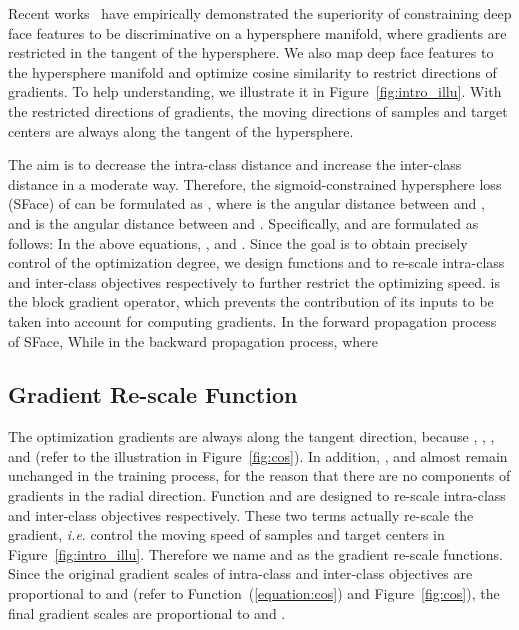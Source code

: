 \documentclass[journal,comsoc]{IEEEtran}
\begin{document}
Recent works~\cite{wang2017normface,Liu2017SphereFace,Wang2018CosFace,deng2019arcface} have empirically demonstrated the superiority of constraining deep face features to be discriminative on a hypersphere manifold, where gradients are restricted in the tangent of the hypersphere. We also map deep face features to the hypersphere manifold and optimize cosine similarity to restrict directions of gradients. To help understanding, we illustrate it in Figure~\ref{fig:intro_illu}. With the restricted directions of gradients, the moving directions of samples and target centers are always along the tangent of the hypersphere. 



The aim is to decrease the intra-class distance and increase the inter-class distance in a moderate way. Therefore, the sigmoid-constrained hypersphere loss (SFace) of  can be formulated as , where  is the angular distance between  and , and  is the angular distance  between  and . Specifically,   and  are formulated as follows:
In the above equations, , and . Since the goal is to obtain precisely control of the optimization degree, we design functions  and  to re-scale intra-class and inter-class objectives respectively to further restrict the optimizing speed.  is the block gradient operator, which prevents the contribution of its inputs to be taken into account for computing gradients. In the forward propagation process of SFace, 
While in the backward propagation process,
where




\subsection{Gradient Re-scale Function}
The optimization gradients are always along the tangent direction, because , , , and  (refer to the illustration in Figure~\ref{fig:cos}). In addition, , and  almost remain unchanged in the training process, for the reason that there are no components of gradients in the radial direction. Function  and  are designed to re-scale intra-class and inter-class objectives respectively. These two terms actually re-scale the gradient, \emph{i.e}. control the moving speed of samples and target centers in Figure~\ref{fig:intro_illu}. Therefore we name  and  as the gradient re-scale functions. Since the original gradient scales of intra-class and inter-class objectives are proportional to  and  (refer to Function~(\ref{equation:cos}) and Figure~\ref{fig:cos}), the final gradient scales are proportional to  and .
\end{document}
